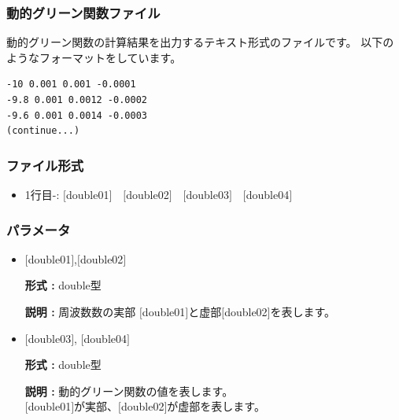 \documentclass[12pt,titlepage]{jarticle}
\begin{document}
\subsubsection{動的グリーン関数ファイル}\label{subsubsec:DynamicalG}

動的グリーン関数の計算結果を出力するテキスト形式のファイルです。
以下のようなフォーマットをしています。
\\
\begin{minipage}{10cm}
\begin{screen}
\begin{verbatim}
-10 0.001 0.001 -0.0001 
-9.8 0.001 0.0012 -0.0002
-9.6 0.001 0.0014 -0.0003
(continue...)
\end{verbatim}
\end{screen}
\end{minipage}


\subsubsection{ファイル形式}
 \begin{itemize}
   \item 1行目-: $[$double01$]$~~$[$double02$]$~~$[$double03$]$~~$[$double04$]$
  \end{itemize}
\subsubsection{パラメータ}
 \begin{itemize}

  \item  $[$double01$]$,$[$double02$]$

 {\bf 形式 :} double型

{\bf 説明 :} 周波数数の実部 $[$double01$]$と虚部$[$double02$]$を表します。
 
 \item  $[$double03$]$, $[$double04$]$

 {\bf 形式 :} double型 

{\bf 説明 :} 動的グリーン関数の値を表します。\\
$[$double01$]$が実部、$[$double02$]$が虚部を表します。\\
\end{itemize}
\end{document}
